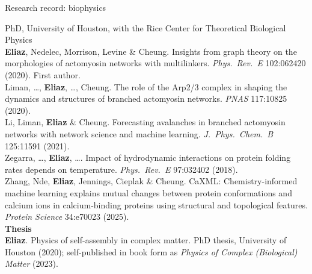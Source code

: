 \begin{frame}[t]{Research record: biophysics}
\vspace{0pt}
{\fontsize{8.1}{9.8}\selectfont
{\color{Muted}PhD, University of Houston, with the Rice Center for Theoretical Biological Physics}\\[2pt]
\textbf{Eliaz}, Nedelec, Morrison, Levine \& Cheung. Insights from graph theory on the morphologies of actomyosin networks with multilinkers. \emph{Phys.\ Rev.\ E} 102:062420 (2020). First author.\\
Liman, \dots, \textbf{Eliaz}, \dots, Cheung. The role of the Arp2/3 complex in shaping the dynamics and structures of branched actomyosin networks. \emph{PNAS} 117:10825 (2020).\\
Li, Liman, \textbf{Eliaz} \& Cheung. Forecasting avalanches in branched actomyosin networks with network science and machine learning. \emph{J.\ Phys.\ Chem.\ B} 125:11591 (2021).\\
Zegarra, \dots, \textbf{Eliaz}, \dots. Impact of hydrodynamic interactions on protein folding rates depends on temperature. \emph{Phys.\ Rev.\ E} 97:032402 (2018).\\
Zhang, Nde, \textbf{Eliaz}, Jennings, Cieplak \& Cheung. CaXML: Chemistry-informed machine learning explains mutual changes between protein conformations and calcium ions in calcium-binding proteins using structural and topological features. \emph{Protein Science} 34:e70023 (2025).\\[4pt]
\textbf{Thesis}\\
\textbf{Eliaz}. Physics of self-assembly in complex matter. PhD thesis, University of Houston (2020); self-published in book form as \emph{Physics of Complex (Biological) Matter} (2023).\par}
\end{frame}
